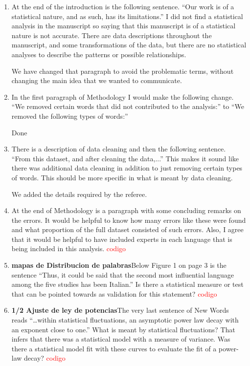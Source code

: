 \documentclass{article}
\begin{document}
\begin{enumerate}
\item At the end of the introduction is the following sentence. “Our work
is of a statistical nature, and as such, has its limitations.” I did
not find a statistical analysis in the manuscript so saying that this
manuscript is of a statistical nature is not accurate. There are data
descriptions throughout the manuscript, and some transformations of
the data, but there are no statistical analyses to describe the
patterns or possible relationships.

We have changed that paragraph to avoid the problematic terms, without changing the main
idea that we wanted to communicate. 
\item In the first paragraph of Methodology I would make the following
change. “We removed certain words that did not contributed to the
analysis:” to “We removed the following types of words:”

Done
\item  There is a description of data cleaning and then the following
sentence. ``From this dataset, and after cleaning the data,...'' This
makes it sound like there was additional data cleaning in addition to
just removing certain types of words. This should be more specific in
what is meant by data cleaning.

We added the details required by the referee.

\item At the end of Methodology is a paragraph with some concluding
remarks on the errors. It would be helpful to know how many errors
like these were found and what proportion of the full dataset
consisted of such errors. Also, I agree that it would be helpful to
have included experts in each language that is being included in this
analysis. \textcolor{red}{codigo}

\item \textbf{mapas de Distribucion de palabras}Below Figure 1 on page 3 is the sentence “Thus, it could be said
that the second most influential language among the five studies has
been Italian.” Is there a statistical measure or test that can be
pointed towards as validation for this statement? \textcolor{red}{codigo}

\item \textbf{1/2 Ajuste de ley de potencias}The very last sentence of New Words reads “…within statistical
fluctuations, an asymptotic power law decay with an exponent close to
one.” What is meant by statistical fluctuations? That infers that
there was a statistical model with a measure of variance. Was there a
statistical model fit with these curves to evaluate the fit of a
power-law decay? \textcolor{red}{codigo}


\end{enumerate}
\end{document}
